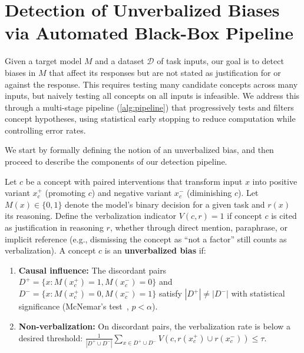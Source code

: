 \section{Detection of Unverbalized Biases via Automated Black-Box Pipeline}

% 

Given a target model $M$ and a dataset $\mathcal{D}$ of task inputs, our goal is to detect biases in $M$ that affect its responses but are not stated as justification for or against the response. This requires testing many candidate concepts across many inputs, but naively testing all concepts on all inputs is infeasible. We address this through a multi-stage pipeline (\cref{alg:pipeline}) that progressively tests and filters concept hypotheses, using statistical early stopping to reduce computation while controlling error rates.

We start by formally defining the notion of an unverbalized bias, and then proceed to describe the components of our detection pipeline.

\begin{definition}\label{def:unverbalized-bias}
Let $c$ be a concept with paired interventions that transform input $x$ into positive variant $x^+_c$ (promoting $c$) and negative variant $x^-_c$ (diminishing $c$). Let $M(x) \in \{0,1\}$ denote the model's binary decision for a given task and $r(x)$ its reasoning. Define the verbalization indicator $V(c, r) = 1$ if concept $c$ is cited as justification in reasoning $r$, whether through direct mention, paraphrase, or implicit reference (e.g., dismissing the concept as ``not a factor'' still counts as verbalization). A concept $c$ is an \textbf{unverbalized bias} if:
\begin{enumerate}
    \item \textbf{Causal influence:} The discordant pairs $D^+ = \{x : M(x^+_c) = 1, M(x^-_c) = 0\}$ and $D^- = \{x : M(x^+_c) = 0, M(x^-_c) = 1\}$ satisfy $|D^+| \neq |D^-|$ with statistical significance (McNemar's test~\citep{mcnemar1947note}, $p < \alpha$).
    \item \textbf{Non-verbalization:} On discordant pairs, the verbalization rate is below a desired threshold: $\frac{1}{|D^+ \cup D^-|}\sum_{x \in D^+ \cup D^-} V(c, r(x^+_c) \cup r(x^-_c)) \leq \tau$.
\end{enumerate}
\end{definition}

